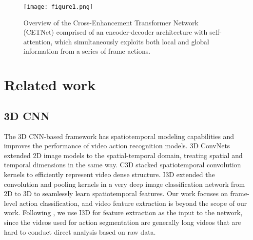 \documentclass[runningheads]{llncs}
\begin{document}
\begin{figure*}
	\centering
	\texttt{[image: figure1.png]}
	\caption{Overview of the Cross-Enhancement Transformer Network (CETNet) comprised of an encoder-decoder architecture with self-attention, which simultaneously exploits both local and global information from a series of frame actions. }
	\label{FIG1}
\end{figure*}
\section{Related work}
\subsection{3D CNN}
\par{
	The 3D CNN-based framework has spatiotemporal modeling capabilities and improves the performance of video action recognition models. 3D ConvNets \cite{tran2015learning,carreira2017quo,feichtenhofer2019slowfast,ming20213d} extended 2D image models \cite{karpathy2014large,wang2018appearance} to the spatial-temporal domain, treating spatial and temporal dimensions in the same way. C3D \cite{tran2015learning} stacked spatiotemporal convolution kernels to efficiently represent video dense structure. I3D \cite{carreira2017quo} extended the convolution and pooling kernels in a very deep image classification network from 2D to 3D to seamlessly learn spatiotemporal features. Our work focuses on frame-level action classification, and video feature extraction is beyond the scope of our work. Following \cite{farha2019ms}, we use I3D \cite{carreira2017quo} for feature extraction as the input to the network, since the videos used for action segmentation are generally long videos that are hard to conduct direct analysis based on raw data.
}
\end{document}
